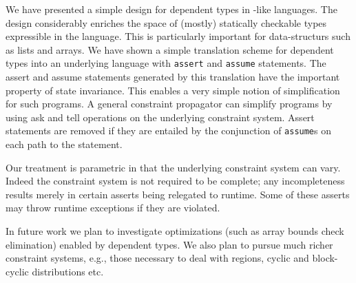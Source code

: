 We have presented a simple design for dependent types in \java-like
languages. The design considerably enriches the space of (mostly)
statically checkable types expressible in the language. This is
particularly important for data-structurs such as lists and arrays. We
have shown a simple translation scheme for dependent types into an
underlying language with {\tt assert} and {\tt assume} statements.
The assert and assume statements generated by this translation have
the important property of state invariance. This enables a very simple
notion of simplification for such programs. A general constraint
propagator can simplify programs by using ask and tell operations on
the underlying constraint system. Assert statements are removed if they
are entailed by the conjunction of {\tt assume}s on each path to the
statement.

Our treatment is parametric in that the underlying constraint system
can vary. Indeed the constraint system is not required to be complete;
any incompleteness results merely in certain asserts being relegated
to runtime. Some of these asserts may throw runtime exceptions if they
are violated.

In future work we plan to investigate optimizations (such as array
bounds check elimination) enabled by dependent types. We also plan to
pursue much richer constraint systems, e.g., those necessary to deal
with regions, cyclic and block-cyclic distributions etc.
